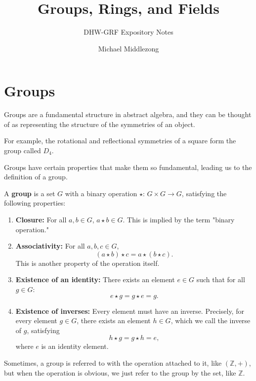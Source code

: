 \documentclass{scrartcl}
\title{Groups, Rings, and Fields}
\subtitle{DHW-GRF Expository Notes}
\author{Michael Middlezong}
\begin{document}
\maketitle

\section{Groups}

Groups are a fundamental structure in abstract algebra, and they can be thought of as representing
the structure of the symmetries of an object.
\begin{example}
    For example, the rotational and reflectional symmetries of a square form the group called $D_4$.
\end{example}
Groups have certain properties that make them so fundamental, leading us to the definition of a group.
\begin{definition}
    A \textbf{group} is a set $G$ with a binary operation $\star$: $G \times G \to G$, satisfying
    the following properties:
    \begin{enumerate}
        \item \textbf{Closure:} For all $a,b \in G$, $a \star b \in G$.
        This is implied by the term "binary operation."
        \item \textbf{Associativity:} For all $a,b,c \in G$,
        \[ (a \star b) \star c = a \star (b \star c). \]
        This is another property of the operation itself.
        \item \textbf{Existence of an identity:} There exists an element $e \in G$ such that
        for all $g \in G$:
        \[ e \star g = g \star e = g. \]
        \item \textbf{Existence of inverses:} Every element must have an inverse.
        Precisely, for every element $g \in G$, there exists
        an element $h \in G$, which we call the inverse of $g$, satisfying
        \[ h \star g = g \star h = e, \]
        where $e$ is an identity element.
    \end{enumerate}
\end{definition}
Sometimes, a group is referred to with the operation attached to it, like $(\mathbb{Z}, +)$,
but when the operation is obvious, we just refer to the group by the set, like $\mathbb{Z}$.
\end{document}
